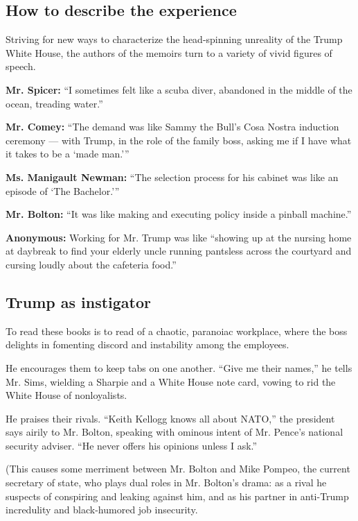 \hypertarget{how-to-describe-the-experience}{%
\subsection{How to describe the
experience}\label{how-to-describe-the-experience}}

Striving for new ways to characterize the head-spinning unreality of the
Trump White House, the authors of the memoirs turn to a variety of vivid
figures of speech.

\textbf{Mr. Spicer:} ``I sometimes felt like a scuba diver, abandoned in
the middle of the ocean, treading water.''

\textbf{Mr. Comey:} ``The demand was like Sammy the Bull's Cosa Nostra
induction ceremony --- with Trump, in the role of the family boss,
asking me if I have what it takes to be a `made man.'''

\textbf{Ms. Manigault Newman:} ``The selection process for his cabinet
was like an episode of `The Bachelor.'''

\textbf{Mr. Bolton:} ``It was like making and executing policy inside a
pinball machine.''

\textbf{Anonymous:} Working for Mr. Trump was like ``showing up at the
nursing home at daybreak to find your elderly uncle running pantsless
across the courtyard and cursing loudly about the cafeteria food.''

\hypertarget{trump-as-instigator}{%
\subsection{Trump as instigator}\label{trump-as-instigator}}

To read these books is to read of a chaotic, paranoiac workplace, where
the boss delights in fomenting discord and instability among the
employees.

He encourages them to keep tabs on one another. ``Give me their names,''
he tells Mr. Sims, wielding a Sharpie and a White House note card,
vowing to rid the White House of nonloyalists.

He praises their rivals. ``Keith Kellogg knows all about NATO,'' the
president says airily to Mr. Bolton, speaking with ominous intent of Mr.
Pence's national security adviser. ``He never offers his opinions unless
I ask.''

(This causes some merriment between Mr. Bolton and Mike Pompeo, the
current secretary of state, who plays dual roles in Mr. Bolton's drama:
as a rival he suspects of conspiring and leaking against him, and as his
partner in anti-Trump incredulity and black-humored job insecurity.

